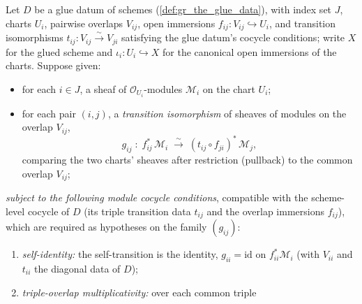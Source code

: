 
\begin{definition}

  \label{def:scheme_modules_glue}
  Let \(D\) be a glue datum of schemes (\cref{def:gr_the_glue_data}), with index set \(J\), charts \(U_i\),
  pairwise overlaps \(V_{ij}\), open immersions
  \(f_{ij} : V_{ij} \hookrightarrow U_i\), and transition isomorphisms
  \(t_{ij} : V_{ij} \xrightarrow{\sim} V_{ji}\) satisfying the glue datum's
  cocycle conditions; write \(X\) for the glued scheme and
  \(\iota_i : U_i \hookrightarrow X\) for the canonical open immersions of the
  charts. Suppose given:
  \begin{itemize}
    \item for each \(i \in J\), a sheaf of \(\mathcal{O}_{U_i}\)-modules \(\mathcal{M}_i\) on the chart \(U_i\);
    \item for each pair \((i,j)\), a \emph{transition isomorphism} of sheaves of
      modules on the overlap \(V_{ij}\),
      \[
        g_{ij} \;:\; f_{ij}^{*}\,\mathcal{M}_i
          \;\xrightarrow{\ \sim\ }\;
        (t_{ij} \circ f_{ji})^{*}\,\mathcal{M}_j,
      \]
      comparing the two charts' sheaves after restriction (pullback) to the
      common overlap \(V_{ij}\);
  \end{itemize}
  \emph{subject to the following module cocycle conditions}, compatible with the
  scheme-level cocycle of \(D\) (its triple transition data \(t_{ij}\) and the
  overlap immersions \(f_{ij}\)), which are required as hypotheses on the family
  \((g_{ij})\):
  \begin{enumerate}
    \item[(C1)] \emph{self-identity:} the self-transition is the identity,
      \(g_{ii} = \mathrm{id}\) on \(f_{ii}^{*}\mathcal{M}_i\) (with
      \(V_{ii}\) and \(t_{ii}\) the diagonal data of \(D\));
    \item[(C2)] \emph{triple-overlap multiplicativity:} over each common triple

\end{enumerate}
\end{definition}
